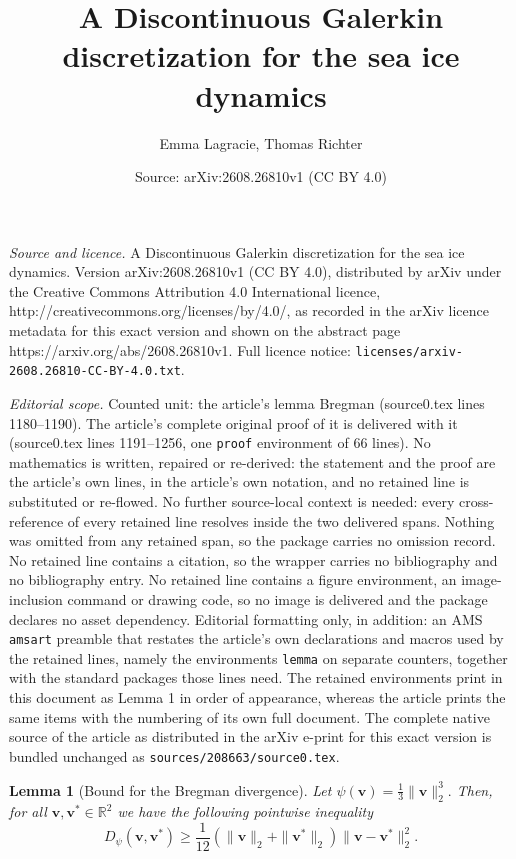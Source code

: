 \documentclass[10pt,a4paper]{amsart}
\title{A Discontinuous Galerkin discretization for the sea ice dynamics}
\author{Emma Lagracie, Thomas Richter}
\date{Source: arXiv:2608.26810v1 (CC BY 4.0)}
\newtheorem{lemma}{Lemma}
\newcommand{\bv}{\mathbf{v}}
\begin{document}
\maketitle

\noindent\emph{Source and licence.} A Discontinuous Galerkin discretization for the sea ice dynamics. Version arXiv:2608.26810v1 (CC BY 4.0), distributed by arXiv under the Creative Commons Attribution 4.0 International licence, http://creativecommons.org/licenses/by/4.0/, as recorded in the arXiv licence metadata for this exact version and shown on the abstract page https://arxiv.org/abs/2608.26810v1. Full licence notice: \texttt{licenses/arxiv-2608.26810-CC-BY-4.0.txt}.\par\smallskip

\noindent\textit{Editorial scope.} Counted unit: the article's lemma Bregman (source0.tex lines 1180--1190). The article's complete original proof of it is delivered with it (source0.tex lines 1191--1256, one \texttt{proof} environment of 66 lines). No mathematics is written, repaired or re-derived: the statement and the proof are the article's own lines, in the article's own notation, and no retained line is substituted or re-flowed.  No further source-local context is needed: every cross-reference of every retained line resolves inside the two delivered spans.  Nothing was omitted from any retained span, so the package carries no omission record.  No retained line contains a citation, so the wrapper carries no bibliography and no bibliography entry.  No retained line contains a figure environment, an image-inclusion command or drawing code, so no image is delivered and the package declares no asset dependency.  Editorial formatting only, in addition: an AMS \texttt{amsart} preamble that restates the article's own declarations and macros used by the retained lines, namely the environments \texttt{lemma} on separate counters, together with the standard packages those lines need.  The retained environments print in this document as Lemma 1 in order of appearance, whereas the article prints the same items with the numbering of its own full document.  The complete native source of the article as distributed in the arXiv e-print for this exact version is bundled unchanged as \texttt{sources/208663/source0.tex}.
\begin{lemma}[Bound for the Bregman divergence]
\label{lemma: bound Bregman}
Let $\psi(\bv)=\frac13 \|\bv\|_2^3.$
Then, for all \(\bv,\bv^*\in\mathbb R^2\) we have the following pointwise inequality
\[
    D_\psi(\bv,\bv^*)
    \geq
    \frac1{12}
    \left (\|\bv\|_2+\|\bv^*\|_2\right )\|\bv -\bv^*\|_2^2.
\]
\end{lemma}
\end{document}

